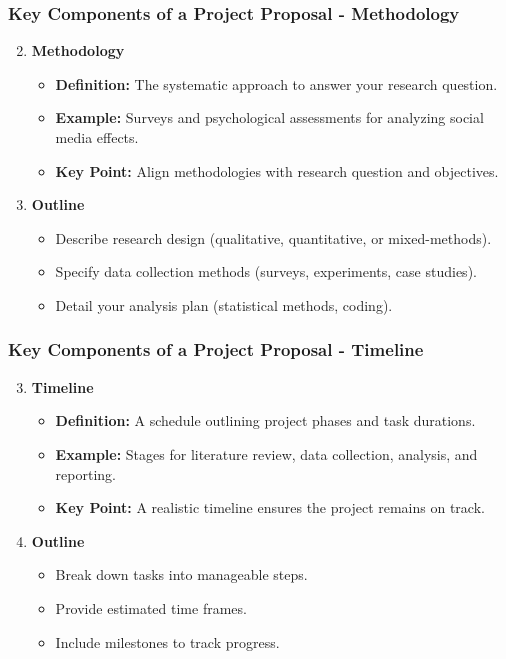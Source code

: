 \documentclass[aspectratio=169]{beamer}
\begin{document}
\begin{frame}[fragile]
    \frametitle{Key Components of a Project Proposal - Methodology}
    \begin{enumerate}
        \setcounter{enumi}{1} %
        \item \textbf{Methodology}
        \begin{itemize}
            \item \textbf{Definition:} The systematic approach to answer your research question.
            \item \textbf{Example:} Surveys and psychological assessments for analyzing social media effects.
            \item \textbf{Key Point:} Align methodologies with research question and objectives.
        \end{itemize}
        \item \textbf{Outline}
        \begin{itemize}
            \item Describe research design (qualitative, quantitative, or mixed-methods).
            \item Specify data collection methods (surveys, experiments, case studies).
            \item Detail your analysis plan (statistical methods, coding).
        \end{itemize}
    \end{enumerate}
\end{frame}

\begin{frame}[fragile]
    \frametitle{Key Components of a Project Proposal - Timeline}
    \begin{enumerate}
        \setcounter{enumi}{2} %
        \item \textbf{Timeline}
        \begin{itemize}
            \item \textbf{Definition:} A schedule outlining project phases and task durations.
            \item \textbf{Example:} Stages for literature review, data collection, analysis, and reporting.
            \item \textbf{Key Point:} A realistic timeline ensures the project remains on track.
        \end{itemize}
        \item \textbf{Outline}
        \begin{itemize}
            \item Break down tasks into manageable steps.
            \item Provide estimated time frames.
            \item Include milestones to track progress.
        \end{itemize}
    \end{enumerate}
\end{frame}
\end{document}
